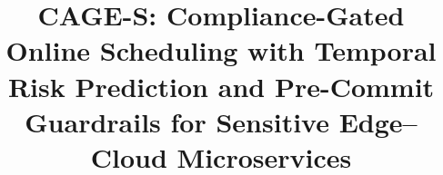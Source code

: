\documentclass[a4paper,fleqn]{cas-dc}
\newif\ifanonymized
\begin{document}
\let\WriteBookmarks\relax
\raggedbottom

\renewcommand{\topfraction}{0.95}
\renewcommand{\bottomfraction}{0.85}
\renewcommand{\textfraction}{0.05}
\renewcommand{\floatpagefraction}{0.8}
\setcounter{topnumber}{2}
\setcounter{bottomnumber}{2}
\setcounter{totalnumber}{4}

\def\floatpagepagefraction{.8}
\def\textpagefraction{.05}
\makeatletter
\setlength{\@fptop}{0pt}
\setlength{\@fpsep}{8pt}  %
\setlength{\@fpbot}{0pt}
\setlength{\floatsep}{8pt plus 2pt minus 2pt}
\setlength{\textfloatsep}{10pt plus 2pt minus 2pt}
\makeatother


\title[mode=title]{CAGE-S: Compliance-Gated Online Scheduling with Temporal Risk Prediction and Pre-Commit Guardrails for Sensitive Edge--Cloud Microservices}

\ifanonymized
  \author[1]{Anonymous Author(s)}
  \affiliation[1]{organization={Anonymous institution},country={Anonymous country}}
\else
  
\fi
\end{document}
